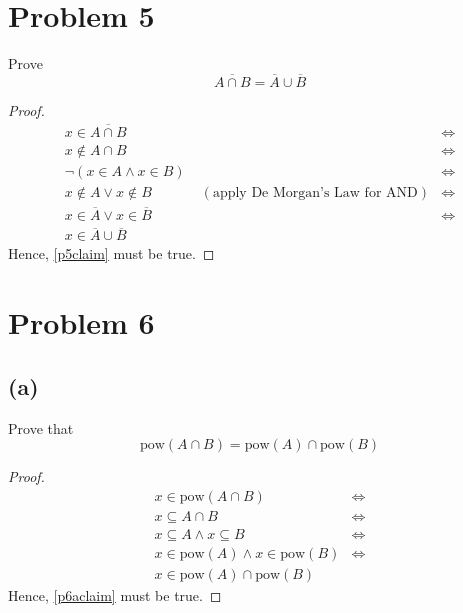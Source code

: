 \documentclass{article}
\begin{document}
\section{Problem 5}
Prove
\begin{equation}\label{p5claim}
	\overline{A \cap B} = \overline{A} \cup \overline{B}
\end{equation}
\begin{proof}
	\begin{align*}
		x \in \overline{A \cap B}                  &                                           & \iff \\
		x \notin A \cap B                          &                                           & \iff \\
		\neg (x \in A \land x \in B)               &                                           & \iff \\
		x \notin A \lor x \notin B                 & \; (\text{apply De Morgan's Law for AND}) & \iff \\
		x \in \overline{A} \lor x \in \overline{B} &                                           & \iff \\
		x \in \overline{A} \cup \overline{B}
	\end{align*}
	Hence, \eqref{p5claim} must be true.
\end{proof}

\pagebreak

\section{Problem 6}
\subsection{(a)}
Prove that
\begin{equation}\label{p6aclaim}
	\text{pow}(A \cap B) = \text{pow}(A) \cap \text{pow}(B)
\end{equation}
\begin{proof}
	\begin{align*}
		x \in \text{pow}(A \cap B)                    & \iff \\
		x \subseteq A \cap B                          & \iff \\
		x \subseteq A \land x \subseteq B             & \iff \\
		x \in \text{pow}(A) \land x \in \text{pow}(B) & \iff \\
		x \in \text{pow}(A) \cap \text{pow}(B)
	\end{align*}
	Hence, \eqref{p6aclaim} must be true.
\end{proof}
\end{document}
